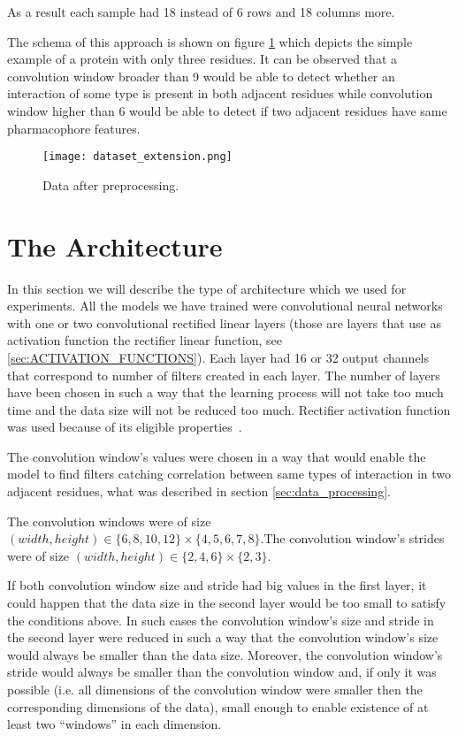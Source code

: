 \documentclass[a4paper,10pt]{report}
\begin{document}
	  As a result each sample had 18 instead of 6 rows and 18 columns more. 
	  
	  The schema of this approach is shown on figure \ref{fig:extended_data} which depicts the simple example of a protein with only three residues. It can be observed that a convolution window broader than 9 would be able to detect whether an interaction of some type is present in both adjacent residues while convolution window higher than 6 would be able to detect if two adjacent residues have same pharmacophore features. 
	  
	  \begin{figure}[h!]
	    \centering
	    \texttt{[image: dataset\_extension.png]}
	    \caption{Data after preprocessing.}
	    \label{fig:extended_data}
	  \end{figure}
	  	
      \section{The Architecture}
      In this section we will describe the type of architecture which we used for experiments. All the models we have trained were convolutional neural networks with one or two convolutional rectified linear layers (those are layers that use as activation function the rectifier linear function, see \ref{sec:ACTIVATION_FUNCTIONS}). Each layer had 16 or 32 output channels that correspond to number of filters created in each layer. The number of layers have been chosen in such a way that the learning process will not take too much time and the data size will not be reduced too much. Rectifier activation function was used because of its eligible properties~\cite{DUTCH}.  
   
      The convolution window's values were chosen in a way that would enable the model to find filters catching correlation between same types of interaction in two adjacent residues, what was described in section \ref{sec:data_processing}. 
      
      The convolution windows were of size $(width, height) \in \{6, 8, 10, 12\} \times \{4, 5, 6, 7, 8\}$.The convolution window's strides were of size $(width, height) \in \{2, 4, 6\} \times \{2, 3\}$. 
      
      If both convolution window size and stride had big values in the first layer, it could happen that the data size in the second layer would be too small to satisfy the conditions above. In such cases the convolution window's size and stride in the second layer were reduced in such a way that the convolution window's size would always be smaller than the data size. Moreover, the convolution window's stride would always be smaller than the convolution window and, if only it was possible (i.e. all dimensions of the convolution window were smaller then the corresponding dimensions of the data), small enough to enable existence of at least two ``windows'' in each dimension. 
      
\end{document}
